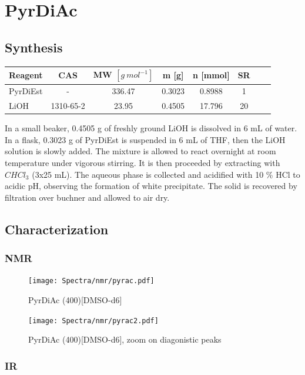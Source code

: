 \documentclass[../Master.tex]{subfiles}
\begin{document}
\newpage \section{PyrDiAc}
\subsection{Synthesis}
\begin{center}
	\begin{tabular}[b]{lccccccc}
		\toprule
		Reagent  & CAS       & MW \([g \ mol^{-1}]\) & m [g]  & n [mmol] & SR \\
		\midrule
		PyrDiEst & -         & 336.47                & 0.3023 & 0.8988   & 1  \\
		LiOH     & 1310-65-2 & 23.95                 & 0.4505 & 17.796   & 20 \\
		\bottomrule
	\end{tabular}
\end{center}

In a small beaker, 0.4505 g of freshly ground LiOH is dissolved in 6 mL of water. In a flask, 0.3023 g of PyrDiEst is suspended in 6 mL of THF, then the LiOH solution is slowly added. The mixture is allowed to react overnight at room temperature under vigorous stirring. It is then proceeded by extracting with \(CHCl_{3}\) (3x25 mL). The aqueous phase is collected and acidified with 10 \% HCl to acidic pH, observing the formation of white precipitate. The solid is recovered by filtration over buchner and allowed to air dry.

\subsection{Characterization}
\subsubsection{NMR}

\begin{figure}[h!]
	\centering
	\texttt{[image: Spectra/nmr/pyrac.pdf]}
	\caption{PyrDiAc (400)[DMSO-d6]}
\end{figure}

\begin{figure}[h!]
	\centering
	\texttt{[image: Spectra/nmr/pyrac2.pdf]}
	\caption{PyrDiAc (400)[DMSO-d6], zoom on diagonistic peaks}
\end{figure}

\newpage
\subsubsection{IR}
\end{document}
